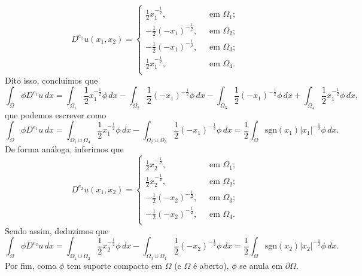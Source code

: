 \documentclass[a4paper, 11pt]{book}
\theoremstyle{definition}
\newcommand{\sgn}{\mathrm{sgn}}
\begin{document}
\begin{ex}
    \begin{equation}
        D^{e_1}u(x_1,x_2) =
        \left\{
            \begin{array}{lr}
                \frac{1}{2}x_1^{-\frac{1}{2}}, &\;\text{ em } \Omega_1;\\
                -\frac{1}{2}(-x_1)^{-\frac{1}{2}}, &\;\text{ em } \Omega_2;\\
                -\frac{1}{2}(-x_1)^{-\frac{1}{2}}, &\;\text{ em } \Omega_3;\\
                \frac{1}{2}x_1^{-\frac{1}{2}}, &\;\text{ em } \Omega_4.\\
            \end{array}
        \right.
    \end{equation}
    Dito isso, concluímos que
    \[
        \int_\Omega \phi D^{e_1}u \,dx = \int_{\Omega_1}  \frac{1}{2} x_1^{-\frac{1}{2}}\phi \,dx - \int_{\Omega_2} \frac{1}{2} (-x_1)^{-\frac{1}{2}} \phi \,dx - \int_{\Omega_3} \frac{1}{2} (-x_1)^{-\frac{1}{2}} \phi \,dx + \int_{\Omega_4} \frac{1}{2} x_1^{-\frac{1}{2}} \phi \,dx,
    \]
    que podemos escrever como
    \[
        \int_\Omega \phi D^{e_1} u \,dx = \int_{\Omega_1 \cup \Omega_4}  \frac{1}{2} x_1^{-\frac{1}{2}}\phi \,dx - \int_{\Omega_2 \cup \Omega_3} \frac{1}{2} (-x_1)^{-\frac{1}{2}} \phi \,dx = \frac{1}{2}\int_\Omega \sgn(x_1) |x_1|^{-\frac{1}{2}} \phi \,dx.
    \]
    De forma análoga, inferimos que
    \begin{equation}
        D^{e_2}u(x_1,x_2) =
        \left\{
            \begin{array}{lr}
                \frac{1}{2}x_2^{-\frac{1}{2}}, &\;\text{ em } \Omega_1;\\
                \frac{1}{2}x_2^{-\frac{1}{2}}, &\;\text{ em } \Omega_2;\\
                -\frac{1}{2}(-x_2)^{-\frac{1}{2}}, &\;\text{ em } \Omega_3;\\
                -\frac{1}{2}(-x_2)^{-\frac{1}{2}}, &\;\text{ em } \Omega_4.\\
            \end{array}
        \right.
    \end{equation}
    Sendo assim, deduzimos que
    \[
        \int_\Omega \phi D^{e_2} u \,dx = \int_{\Omega_1 \cup \Omega_2}  \frac{1}{2} x_2^{-\frac{1}{2}}\phi \,dx - \int_{\Omega_3 \cup \Omega_4} \frac{1}{2} (-x_2)^{-\frac{1}{2}} \phi \,dx = \frac{1}{2}\int_\Omega \sgn(x_2) |x_2|^{-\frac{1}{2}} \phi \,dx.
    \]
    Por fim, como $\phi$ tem suporte compacto em $\Omega$ (e $\Omega$ é aberto), $\phi$ se anula em $\partial\Omega$.

\end{ex}
\end{document}
